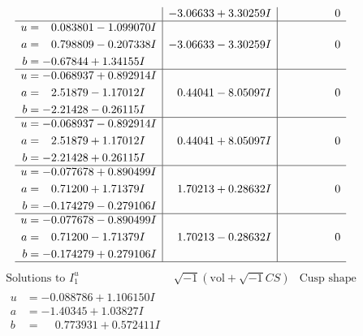\documentclass[1p]{elsarticle_modified}
\theoremstyle{definition}
\newcommand{\I}{\sqrt{-1}}
\begin{document}
$$\begin{array}{c|c|c}
 & -3.06633 + 3.30259 I & \phantom{-0.000000 } 0 \\ \hline\begin{aligned}
u &= \phantom{-}0.083801 - 1.099070 I \\
a &= \phantom{-}0.798809 - 0.207338 I \\
b &= -0.67844 + 1.34155 I\end{aligned}
 & -3.06633 - 3.30259 I & \phantom{-0.000000 } 0 \\ \hline\begin{aligned}
u &= -0.068937 + 0.892914 I \\
a &= \phantom{-}2.51879 - 1.17012 I \\
b &= -2.21428 - 0.26115 I\end{aligned}
 & \phantom{-}0.44041 - 8.05097 I & \phantom{-0.000000 } 0 \\ \hline\begin{aligned}
u &= -0.068937 - 0.892914 I \\
a &= \phantom{-}2.51879 + 1.17012 I \\
b &= -2.21428 + 0.26115 I\end{aligned}
 & \phantom{-}0.44041 + 8.05097 I & \phantom{-0.000000 } 0 \\ \hline\begin{aligned}
u &= -0.077678 + 0.890499 I \\
a &= \phantom{-}0.71200 + 1.71379 I \\
b &= -0.174279 - 0.279106 I\end{aligned}
 & \phantom{-}1.70213 + 0.28632 I & \phantom{-0.000000 } 0 \\ \hline\begin{aligned}
u &= -0.077678 - 0.890499 I \\
a &= \phantom{-}0.71200 - 1.71379 I \\
b &= -0.174279 + 0.279106 I\end{aligned}
 & \phantom{-}1.70213 - 0.28632 I & \phantom{-0.000000 } 0\\
 \hline 
 \end{array}$$\newpage$$\begin{array}{c|c|c}  
\text{Solutions to }I^u_{1}& \I (\text{vol} + \sqrt{-1}CS) & \text{Cusp shape}\\
 \hline 
\begin{aligned}
u &= -0.088786 + 1.106150 I \\
a &= -1.40345 + 1.03827 I \\
b &= \phantom{-}0.773931 + 0.572411 I\end{aligned}

\end{array}$$
\end{document}
